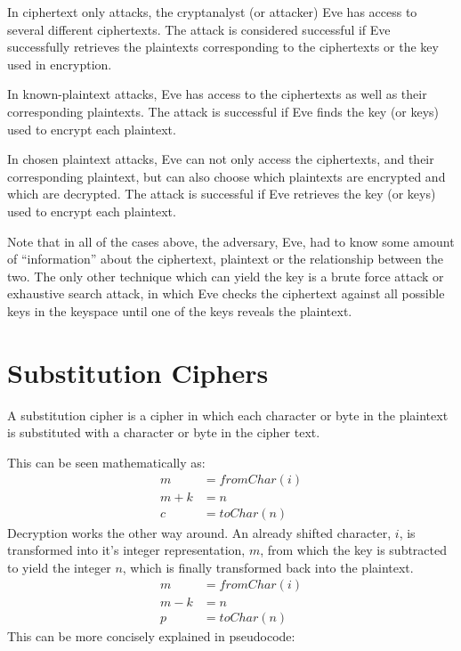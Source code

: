 \documentclass[12pt, a4paper, draft]{report}
\begin{document}
In ciphertext only attacks, the cryptanalyst (or attacker) Eve has access
to several different ciphertexts. The attack is considered successful if
Eve successfully retrieves the plaintexts corresponding to the ciphertexts
or the key used in encryption.

In known-plaintext attacks, Eve has access to the ciphertexts as well
as their corresponding plaintexts. The attack is successful if Eve
finds the key (or keys) used to encrypt each plaintext.

In chosen plaintext attacks, Eve can not only access the ciphertexts,
and their corresponding plaintext, but can also choose which plaintexts
are encrypted and which are decrypted. The attack is successful if Eve
retrieves the key (or keys) used to encrypt each plaintext.

Note that in all of the cases above, the adversary, Eve, had to know
some amount of ``information'' about the ciphertext, plaintext or the
relationship between the two. The only other technique which can yield
the key is a brute force attack or exhaustive search attack, in which
Eve checks the ciphertext against all possible keys in the keyspace until
one of the keys reveals the plaintext.


\section{Substitution Ciphers}


A substitution cipher is a cipher in which each character or byte in the
plaintext is substituted with a character or byte in the cipher text.

This can be seen mathematically as:
\begin{align*}
    m & = fromChar(i)\\
    m + k & = n\\
    c & = toChar(n)
\end{align*}
Decryption works the other way around. An already shifted character, $i$,
is transformed into it's integer representation, $m$, from which the key
is subtracted to yield the integer $n$, which is finally transformed back
into the plaintext.
\begin{align*}
    m & = fromChar(i)\\
    m - k & = n\\
    p & = toChar(n)
\end{align*}
This can be more concisely explained in pseudocode:
\end{document}
